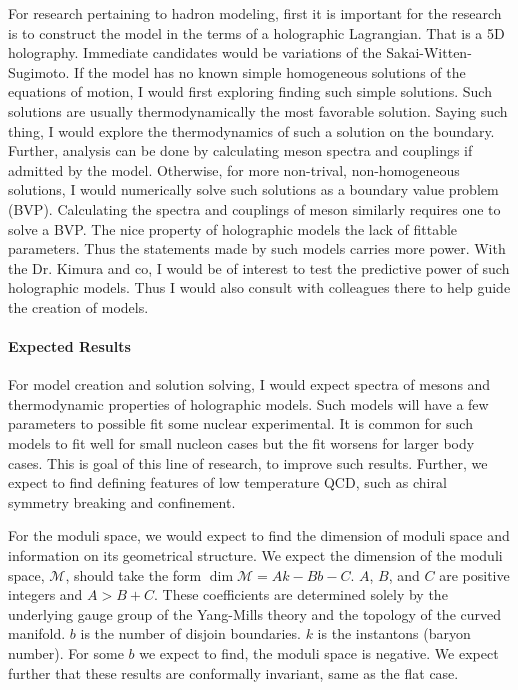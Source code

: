 \documentclass[12pt]{article}
\begin{document}
For research pertaining to hadron modeling, first it is important for the research is to construct the model in the terms of a holographic Lagrangian.
%
That is a 5D holography.
%
Immediate candidates would be variations of the Sakai-Witten-Sugimoto.
%
If the model has no known simple homogeneous solutions of the equations of motion, I would first exploring finding such simple solutions.
%
Such solutions are usually thermodynamically the most favorable solution.
%
Saying such thing, I would explore the thermodynamics of such a solution on the boundary.
%
Further, analysis can be done by calculating meson spectra and couplings if admitted by the model.
%
Otherwise, for more non-trival, non-homogeneous solutions, I would numerically solve such solutions as a boundary value problem (BVP).
%
Calculating the spectra and couplings of meson similarly requires one to solve a BVP.
%
The nice property of holographic models the lack of fittable parameters.
%
Thus the statements made by such models carries more power.
%
With the Dr. Kimura and co, I would be of interest to test the predictive power of such holographic models.
%
Thus I would also consult with colleagues there to help guide the creation of models.

\paragraph{Expected Results}

For model creation and solution solving, I would expect spectra of mesons and thermodynamic properties of holographic models.
%
Such models will have a few parameters to possible fit some nuclear experimental.
%
It is common for such models to fit well for small nucleon cases but the fit worsens for larger body cases.
%
This is goal of this line of research, to improve such results.
%
Further, we expect to find defining features of low temperature QCD, such as chiral symmetry breaking and confinement.

For the moduli space, we would expect to find the dimension of moduli space and information on its geometrical structure.
%
We expect the dimension of the moduli space, $\mathcal{M}$, should take the form $\dim\mathcal{M} = A k - B b - C$.
%
$A$, $B$, and $C$ are positive integers and $A > B + C$. 
%
These coefficients are determined solely by the underlying gauge group of the Yang-Mills theory and the topology of the curved manifold.
%
$b$ is the number of disjoin boundaries.
%
$k$ is the instantons (baryon number).
%
For some $b$ we expect to find, the moduli space is negative.
%
We expect further that these results are conformally invariant, same as the flat case.
\end{document}
